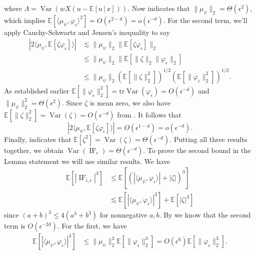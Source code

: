 \documentclass[11pt]{article}
\begin{document}
where $\Lambda = \operatorname{Var}(wX(u - \mathbb{E}[u \,|\, x]))$. Now  indicates that $\|\mu_\psi\|_2 = \Theta(\epsilon^2)$, which implies $\mathbb{E}[\langle \mu_{\psi}, \varphi_{\epsilon}\rangle^2] = O(\epsilon^{2-d}) = o(\epsilon^{-d})$. For the second term, we'll apply Cauchy-Schwartz and Jensen's inequality to say
\begin{align*}
    |2\langle \mu_{\psi}, \mathbb{E}[\zeta \varphi_{ \epsilon}]\rangle| & \lesssim \|\mu_\psi\|_2\|\mathbb{E}[\zeta \varphi_{\epsilon}]\|_2 \tag{Cauchy-Schwartz} \\
    &\leq\|\mu_\psi\|_2\|\mathbb{E}[\|\zeta\|_2 \|\varphi_{\epsilon}\|_2] \tag{Jensen's Inequality}\\
    &\leq \|
    \mu_{\psi}\|_2 \left(\mathbb{E}[\|\zeta\|_2^2]\right)^{1/2}\left(\mathbb{E}[\|\varphi_{\epsilon}\|_2^2]\right)^{1/2}. \tag{Cauchy-Schwartz}
\end{align*}
As established earlier $\mathbb{E}[\|\varphi_{\epsilon}\|_2^2] = \text{tr}\operatorname{Var}(\varphi_\epsilon) = O(\epsilon^{-d})$ and $\|\mu_\psi\|_2^2 = \Theta(\epsilon^2)$. Since $\zeta$ is mean zero, we also have $\mathbb{E}[\|\zeta\|_2^2] = \operatorname{Var}(\zeta) = O(\epsilon^{-d})$ from . It follows that 
\[|2\langle \mu_{\psi}, \mathbb{E}[\zeta \varphi_{ \epsilon}]\rangle| = O(\epsilon^{1-d}) = o(\epsilon^{-d}).\]
Finally,  indicates that $\mathbb{E}[\zeta^2] = \operatorname{Var}(\zeta) = \Theta(\epsilon^{-d}).$ Putting all three results together, we obtain $\operatorname{Var}(\operatorname{IF}_{\epsilon}) = \Theta(\epsilon^{-d}).$ To prove the second bound in the Lemma statement we will use similar results. We have
\begin{align*}
    \mathbb{E}[|\operatorname{IF}_{i, \epsilon}|^3] &\leq  \mathbb{E}\left[(|\langle \mu_{\psi}, \varphi_{\epsilon}\rangle|+ |\zeta|)^3\right] \\
    &\lesssim \mathbb{E}\left[|\langle \mu_{\psi}, \varphi_{\epsilon}\rangle|^3 \right]+ \mathbb{E}\left[|\zeta|^3\right]
\end{align*}
since $(a + b)^3 \leq 4(a^3 + b^3)$ for nonnegative $a, b$. By  we know that the second term is $O(\epsilon^{-2d})$. For the first, we have 
\begin{align*}
    \mathbb{E}\left[|\langle \mu_{\psi}, \varphi_{\epsilon}\rangle|^3 \right] &\leq \|\mu_{\psi}\|_2^3\mathbb{E}[\|\varphi_{\epsilon}\|_2^3] = O(\epsilon^6)\mathbb{E}[\|\varphi_{\epsilon}\|_2^3].
\end{align*}
\end{document}

